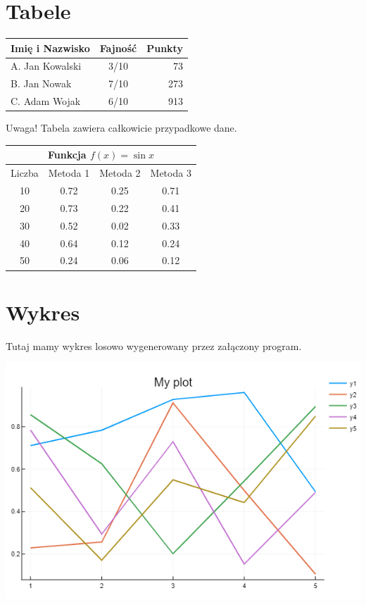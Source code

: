 \documentclass[12pt,a4paper]{article}
\begin{document}
\section{Tabele}

\begin{center}
	\begin{tabular}{|l||cr|}\hline
	Imię i Nazwisko & Fajność & Punkty \\ \hline
	A. Jan Kowalski & 3/10 	  & 73 \\
	B. Jan Nowak & 7/10 	  & 273 \\
	C. Adam Wojak & 6/10 	  & 913 \\ \hline
	\end{tabular}
\end{center}

Uwaga! Tabela zawiera całkowicie przypadkowe dane.

\begin{center}
	\begin{tabular}{||c|c|c|c||} \hline
	\multicolumn{4}{||c||}{Funkcja $f(x) = \sin x$} \\ \hline
	Liczba & Metoda 1 & Metoda 2 & Metoda 3 \\ \hline
	10 	   & 0.72     & 0.25     & 0.71     \\
	20 	   & 0.73     & 0.22     & 0.41     \\
	30 	   & 0.52     & 0.02     & 0.33     \\
	40 	   & 0.64     & 0.12     & 0.24     \\
	50 	   & 0.24     & 0.06     & 0.12     \\ \hline
	\end{tabular}
\end{center}

\section{Wykres}
Tutaj mamy wykres losowo wygenerowany przez załączony program.

\includegraphics[scale=0.7]{plot}
\end{document}
